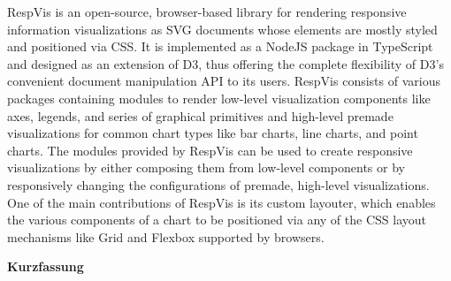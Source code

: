 RespVis is an open-source, browser-based library for rendering responsive information visualizations as SVG documents whose elements are mostly styled and positioned via CSS.
It is implemented as a NodeJS package in TypeScript and designed as an extension of D3, thus offering the complete flexibility of D3's convenient document manipulation API to its users.
RespVis consists of various packages containing modules to render low-level visualization components like axes, legends, and series of graphical primitives and high-level premade visualizations for common chart types like bar charts, line charts, and point charts.
The modules provided by RespVis can be used to create responsive visualizations by either  composing them from low-level components or by responsively changing the configurations of premade, high-level visualizations.
One of the main contributions of RespVis is its custom layouter, which enables the various components of a chart to be positioned via any of the CSS layout mechanisms like Grid and Flexbox supported by browsers.






\cleardoublepage

\vspace*{2cm}


\begin{otherlanguage}{austrian}

    \begin{center}
        {\Large\sffamily\bfseries Kurzfassung}
    \end{center}



\end{otherlanguage}



